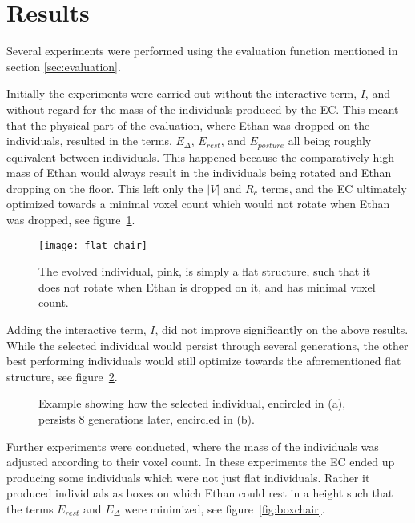 \section{Results} Several experiments were performed using the evaluation
function mentioned in section \ref{sec:evaluation}. 

Initially the experiments were carried out without the interactive term, $I$,
and without regard for the mass of the individuals produced by the EC. This
meant that the physical part of the evaluation, where Ethan was dropped on the
individuals, resulted in the terms, $E_\Delta$, $E_{rest}$, and $E_{posture}$
all being roughly equivalent between individuals. This happened because the
comparatively high mass of Ethan would always result in the individuals being
rotated and Ethan dropping on the floor. This left only the $|V|$ and $R_c$
terms, and the EC ultimately optimized towards a minimal voxel count which would
not rotate when Ethan was dropped, see figure~\ref{fig:flat_object}.

\begin{figure}[ht]
\centering
\texttt{[image: flat\_chair]}
\caption{The evolved individual, pink, is simply a flat structure, such that
it does not rotate when Ethan is dropped on it, and has minimal voxel
count.} \label{fig:flat_object} \end{figure}

Adding the interactive term, $I$, did not improve significantly on the above
results. While the selected individual would persist through several
generations, the other best performing individuals would still optimize towards
the aforementioned flat structure, see figure~\ref{fig:selection}.
\begin{figure}[ht]
	\centering
	 \hfil
	\caption{Example showing how the selected individual, encircled in (a),
	persists 8 generations later, encircled in (b).} \label{fig:selection}
\end{figure}

Further experiments were conducted, where the mass of the individuals was
adjusted according to their voxel count. In these experiments the EC ended up
producing some individuals which were not just flat individuals. Rather it produced
individuals as boxes on which Ethan could rest in a height such that the terms
$E_{rest}$ and $E_\Delta$ were minimized, see figure~\ref{fig:boxchair}.

